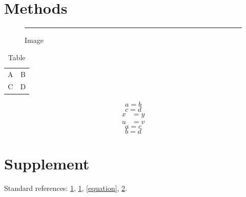 
\section{Methods}\label{topic}
\begin{figure}[htbp]\centering\rule{20mm}{3mm}\caption{Image}\label{picture}\end{figure}
\begin{table}[htbp]\caption{Table}\label{table}\begin{tabular}{cc}A&B\\C&D\end{tabular}\end{table}
\begin{equation}a=b\label{equation}\end{equation}
\begin{equation}c=d\label{only-wise}\end{equation}
\begin{align}x&=y\label{line-a}\\u&=v\label{line-b}\end{align}
\begin{equation}a=c\tag{S}\label{tagged}\end{equation}
\begin{equation}b=d\tag*{S}\label{bare}\end{equation}
\appendix\section{Supplement}\label{appendix}
\clearpage
Standard references: \ref{picture}, \ref{table}, \eqref{equation}, \ref{appendix}.
\par
\ifdefined\WiseChecks
  \clearpage
  {}
\fi
\par
